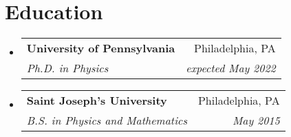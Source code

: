 \documentclass[letterpaper,11pt]{article}
\makeatletter
\newcommand{\resumeSubheading}[4]{
  \vspace{-1pt}\item
    \begin{tabular*}{0.97\textwidth}{l@{\extracolsep{\fill}}r}
      \textbf{#1} & #2 \\
      \textit{\small#3} & \textit{\small #4} \\
    \end{tabular*}\vspace{-5pt}
}
\newcommand{\resumeSubHeadingListStart}{\begin{itemize}[leftmargin=*]}
\newcommand{\resumeSubHeadingListEnd}{\end{itemize}}
\makeatother
\begin{document}
\section{Education}
  \resumeSubHeadingListStart
    \resumeSubheading
      {University of Pennsylvania}{Philadelphia, PA}
      {Ph.D. in Physics}{expected May 2022}
    \resumeSubheading
      {Saint Joseph's University}{Philadelphia, PA}
      {B.S. in Physics and Mathematics}{May 2015}
  \resumeSubHeadingListEnd

\end{document}
